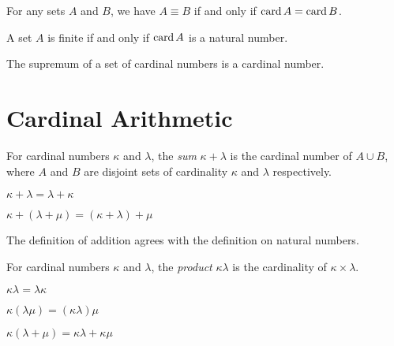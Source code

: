 \begin{theorem}
    For any sets $A$ and $B$, we have $A \equiv B$ if and only if $\operatorname{card} A = \operatorname{card} B$.
\end{theorem}

\begin{theorem}
    A set $A$ is finite if and only if $\operatorname{card} A$ is a natural number.
\end{theorem}

\begin{theorem}
    The supremum of a set of cardinal numbers is a cardinal number.
\end{theorem}

\section{Cardinal Arithmetic}

\begin{definition}
    For cardinal numbers $\kappa$ and $\lambda$, the \emph{sum} $\kappa + \lambda$
    is the cardinal number of $A \cup B$, where $A$ and $B$ are disjoint sets
    of cardinality $\kappa$ and $\lambda$ respectively.
\end{definition}

\begin{theorem}
    $\kappa + \lambda = \lambda + \kappa$
\end{theorem}

\begin{theorem}
    $\kappa + (\lambda + \mu) = (\kappa + \lambda) + \mu$
\end{theorem}

\begin{theorem}
    The definition of addition agrees with the definition on natural numbers.
\end{theorem}

\begin{definition}
    For cardinal numbers $\kappa$ and $\lambda$, the \emph{product}
    $\kappa \lambda$ is the cardinality of $\kappa \times \lambda$.
\end{definition}

\begin{theorem}
    $\kappa \lambda = \lambda \kappa$
\end{theorem}

\begin{theorem}
    $\kappa (\lambda \mu) = (\kappa \lambda) \mu$
\end{theorem}

\begin{theorem}
    $\kappa (\lambda + \mu) = \kappa \lambda + \kappa \mu$
\end{theorem}

